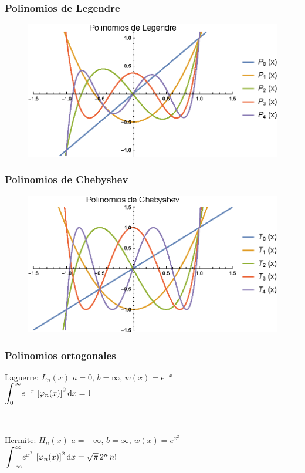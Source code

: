 \documentclass[12pt]{beamer}
\begin{document}
\begin{frame}
\frametitle{Polinomios de Legendre}
\begin{figure}
  \centering
  \includegraphics[scale=0.9]{Imagenes/plot_Legendre_01.eps}
\end{figure}
\end{frame}
\begin{frame}
\frametitle{Polinomios de Chebyshev}
\begin{figure}
  \centering
  \includegraphics[scale=0.9]{Imagenes/plot_Chebyshev_01.eps}
\end{figure}
\end{frame}
\begin{frame}
\frametitle{Polinomios ortogonales}
Laguerre: $L_{n} (x)$ \hspace{0.5cm} $a = 0$, $b = \infty$, $w (x) = e^{-x}$ \\[0.5em]
$\scaleint{6ex}_{\bs 0}^{\infty} e^{-x} \, \left[ \varphi_{n} (x)\right]^{2} \dd{x} = 1$ 
\\[0.5em]
\rule{10cm}{1pt}
\\[0.5em]
\pause
Hermite: $H_{n} (x)$ \hspace{0.5cm} $a = -\infty$, $b = \infty$, $w (x) = e^{x^{2}}$ \\
$\scaleint{6ex}_{\bs -\infty}^{\infty} e^{x^{2}} \, \left[ \varphi_{n} (x) \right]^{2} \dd{x} = \sqrt{\pi} \, 2^{n} \, n!$
\end{frame}
\end{document}
